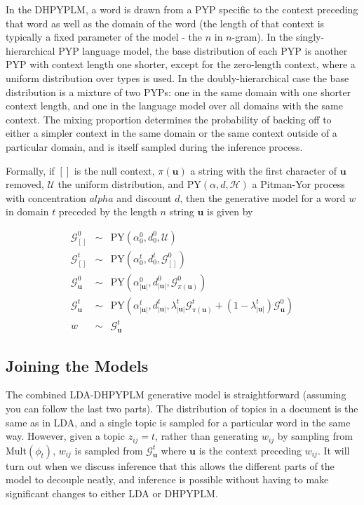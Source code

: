 In the DHPYPLM, a word is drawn from a PYP specific to the context preceding that word as well as the domain of the word (the length of that context is typically a fixed parameter of the model - the $n$ in $n$-gram).  In the singly-hierarchical PYP language model, the base distribution of each PYP is another PYP with context length one shorter, except for the zero-length context, where a uniform distribution over types is used.  In the doubly-hierarchical case the base distribution is a mixture of two PYPs: one in the same domain with one shorter context length, and one in the language model over all domains with the same context.  The mixing proportion determines the probability of backing off to either a simpler context in the same domain or the same context outside of a particular domain, and is itself sampled during the inference process.  

Formally, if $[]$ is the null context, $\pi(\mathbf{u})$ a string with the first character of $\mathbf{u}$ removed, $\mathcal{U}$ the uniform distribution, and PY$(\alpha,d,\mathcal{H})$ a Pitman-Yor process with concentration $alpha$ and discount $d$, then the generative model for a word $w$ in domain $t$ preceded by the length $n$ string $\mathbf{u}$ is given by

\begin{eqnarray}
\mathcal{G}^0_{[]} & \sim & \textrm{PY}(\alpha^0_{0},d^0_{0},\mathcal{U}) \nonumber \\
 \mathcal{G}^t_{[]} & \sim & \textrm{PY}(\alpha^t_{0},d^t_{0},\mathcal{G}^0_{[]}) \nonumber \\
\mathcal{G}^0_{\mathbf{u}} & \sim & \textrm{PY}(\alpha^0_{|\mathbf{u}|},d^0_{|\mathbf{u}|},\mathcal{G}^0_{\pi(\mathbf{u})}) \nonumber \\
 \mathcal{G}^t_{\mathbf{u}} & \sim & \textrm{PY}(\alpha^t_{|\mathbf{u}|},d^t_{|\mathbf{u}|},\lambda^t_{|\mathbf{u}|}\mathcal{G}^t_{\pi(\mathbf{u})} + (1-\lambda^t_{|\mathbf{u}|}) \mathcal{G}^0_{\mathbf{u}}) \nonumber \\
w & \sim & \mathcal{G}^t_{\mathbf{u}}
\end{eqnarray}

\subsection{Joining the Models}

The combined LDA-DHPYPLM generative model is straightforward (assuming you can follow the last two parts).  The distribution of topics in a document is the same as in LDA, and a single topic is sampled for a particular word in the same way.  However, given a topic $z_{ij} = t$, rather than generating $w_{ij}$ by sampling from Mult$(\phi_t)$, $w_{ij}$ is sampled from $\mathcal{G}^t_{\mathbf{u}}$ where $\mathbf{u}$ is the context preceding $w_{ij}$.  It will turn out when we discuss inference that this allows the different parts of the model to decouple neatly, and inference is possible without having to make significant changes to either LDA or DHPYPLM.
